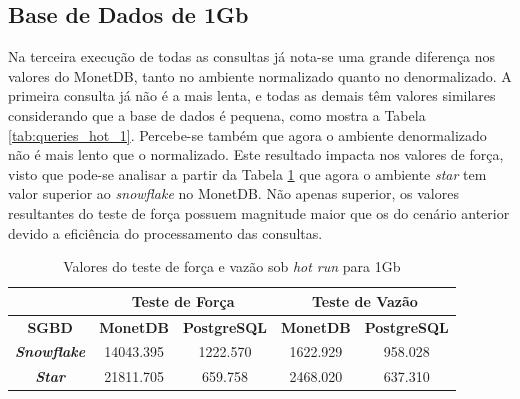 \subsection{Base de Dados de 1Gb}

Na terceira execução de todas as consultas já nota-se uma grande diferença nos valores do MonetDB, tanto no ambiente normalizado quanto no denormalizado. A primeira consulta já não é a mais lenta, e todas as demais têm valores similares considerando que a base de dados é pequena, como mostra a Tabela \ref{tab:queries_hot_1}. Percebe-se também que agora o ambiente denormalizado não é mais lento que o normalizado. Este resultado impacta nos valores de força, visto que pode-se analisar a partir da Tabela \ref{tab:forca_vazao_hot_1} que agora o ambiente \textit{star} tem valor superior ao \textit{snowflake} no MonetDB. Não apenas superior, os valores resultantes do teste de força possuem magnitude maior que os do cenário anterior devido a eficiência do processamento das consultas.


\begin{table}[htpb]
        \centering
        \caption{Valores do teste de força e vazão sob \textit{hot run} para 1Gb}
        \label{tab:forca_vazao_hot_1}
        \begin{tabular}{|c|c|c|c|c|}
        \hline
                                & \multicolumn{2}{c|}{\textbf{Teste de Força}} & \multicolumn{2}{c|}{\textbf{Teste de Vazão}} \\ \hline
        \textbf{SGBD}      & \textbf{MonetDB}    & \textbf{PostgreSQL}    & \textbf{MonetDB}    & \textbf{PostgreSQL}    \\ \hline
        \textit{\textbf{Snowflake}} & 14043.395           & 1222.570               & 1622.929            & 958.028                \\ \hline
        \textit{\textbf{Star}}      & 21811.705           & 659.758                & 2468.020            & 637.310                \\ \hline
        \end{tabular}
\end{table}

